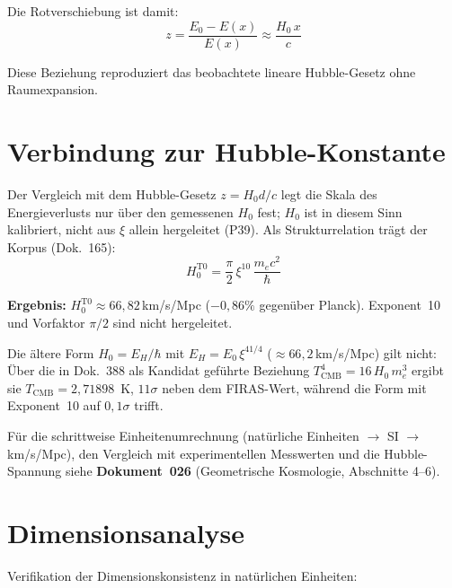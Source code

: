 	Die Rotverschiebung ist damit:
	\begin{equation}
		z = \frac{E_0 - E(x)}{E(x)} \approx \frac{H_0\, x}{c}
	\end{equation}

	Diese Beziehung reproduziert das beobachtete lineare Hubble-Gesetz ohne Raumexpansion.

\section{Verbindung zur Hubble-Konstante}

	Der Vergleich mit dem Hubble-Gesetz $z = H_0 d/c$ legt die Skala des Energieverlusts nur über den gemessenen $H_0$ fest; $H_0$ ist in diesem Sinn kalibriert, nicht aus $\xi$ allein hergeleitet (P39). Als Strukturrelation trägt der Korpus (Dok.~165):
	\begin{equation}
		\boxed{H_0^{\text{T0}} = \frac{\pi}{2}\,\xi^{10}\,\frac{m_e c^2}{\hbar}}
	\end{equation}

	\textbf{Ergebnis:} $H_0^{\text{T0}} \approx 66{,}82\,$km/s/Mpc ($-0{,}86\%$ gegenüber Planck). Exponent~10 und Vorfaktor $\pi/2$ sind nicht hergeleitet.

	Die ältere Form $H_0 = E_H/\hbar$ mit $E_H = E_0\,\xi^{41/4}$ ($\approx 66{,}2\,$km/s/Mpc) gilt nicht: Über die in Dok.~388 als Kandidat geführte Beziehung $T_{\mathrm{CMB}}^4 = 16\,H_0\,m_e^3$ ergibt sie $T_{\mathrm{CMB}} = 2{,}71898$~K, $11\sigma$ neben dem FIRAS-Wert, während die Form mit Exponent~10 auf $0{,}1\sigma$ trifft.

	Für die schrittweise Einheitenumrechnung (natürliche Einheiten $\rightarrow$ SI $\rightarrow$ km/s/Mpc), den Vergleich mit experimentellen Messwerten und die Hubble-Spannung siehe \textbf{Dokument~026} (Geometrische Kosmologie, Abschnitte 4--6).

\section{Dimensionsanalyse}

	Verifikation der Dimensionskonsistenz in natürlichen Einheiten:

